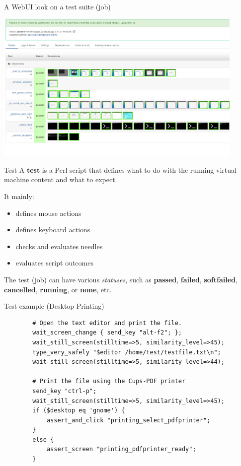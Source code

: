 \documentclass[12pt,aspectratio=169]{beamer}
\begin{document}
\begin{frame}{A WebUI look on a test suite (job)}
	\begin{center}
		\includegraphics[width=12cm]{suite}
	\end{center}
\end{frame}

\begin{frame}{Test}
 	A \textbf{test} is a Perl script that defines what to do with the running virtual machine content and what to expect. 
 	
 	It mainly:
 	
 	\vspace{5pt}
		
	\begin{itemize}
		\item defines mouse actions
		\item defines keyboard actions
		\item checks and evaluates needles
		\item evaluates script outcomes
	\end{itemize}

	\vspace{5pt}
	
	The test (job) can have various \textit{statuses}, such as \textbf{passed}, \textbf{failed}, \textbf{softfailed}, \textbf{cancelled}, \textbf{running}, or \textbf{none}, etc.
\end{frame}

\begin{frame}[fragile]{Test example (Desktop Printing)}
	\begin{verbatim}
		# Open the text editor and print the file.
		wait_screen_change { send_key "alt-f2"; };
		wait_still_screen(stilltime=>5, similarity_level=>45);
		type_very_safely "$editor /home/test/testfile.txt\n";
		wait_still_screen(stilltime=>5, similarity_level=>44);
		
		# Print the file using the Cups-PDF printer
		send_key "ctrl-p";
		wait_still_screen(stilltime=>5, similarity_level=>45);
		if ($desktop eq 'gnome') {
		    assert_and_click "printing_select_pdfprinter";
		}
		else {
		    assert_screen "printing_pdfprinter_ready";
		}
	\end{verbatim}
\end{frame}
\end{document}

